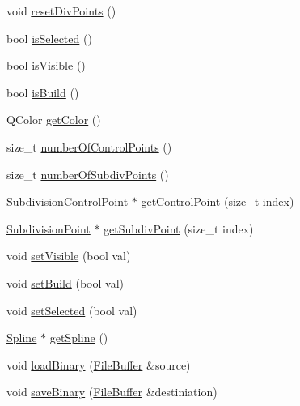 \begin{DoxyCompactItemize}
void \hyperlink{classShipCAD_1_1SubdivisionControlCurve_a34e280e9ba6e6705577d1afd229e9f20}{reset\-Div\-Points} ()
\item 
bool \hyperlink{classShipCAD_1_1SubdivisionControlCurve_a8b3c57aba1c16b77b902daacd7b88d0c}{is\-Selected} ()
\item 
bool \hyperlink{classShipCAD_1_1SubdivisionControlCurve_a36bcf74cf20d7f1ae888f25f774b040d}{is\-Visible} ()
\item 
bool \hyperlink{classShipCAD_1_1SubdivisionControlCurve_a6d0039b0dac74ed558bfb684fb4b4497}{is\-Build} ()
\item 
Q\-Color \hyperlink{classShipCAD_1_1SubdivisionControlCurve_a1dd7d33fd574c3cfdd53ccbb13abb695}{get\-Color} ()
\item 
size\-\_\-t \hyperlink{classShipCAD_1_1SubdivisionControlCurve_aaa9d504f115655dbb930493d96b9db62}{number\-Of\-Control\-Points} ()
\item 
size\-\_\-t \hyperlink{classShipCAD_1_1SubdivisionControlCurve_a7b68fcef6035edcb10fedc996d10272f}{number\-Of\-Subdiv\-Points} ()
\item 
\hyperlink{classShipCAD_1_1SubdivisionControlPoint}{Subdivision\-Control\-Point} $\ast$ \hyperlink{classShipCAD_1_1SubdivisionControlCurve_a0331fade870dd4856c070e2f487882b5}{get\-Control\-Point} (size\-\_\-t index)
\item 
\hyperlink{classShipCAD_1_1SubdivisionPoint}{Subdivision\-Point} $\ast$ \hyperlink{classShipCAD_1_1SubdivisionControlCurve_a52b12b58d524baba317ab6504e80018f}{get\-Subdiv\-Point} (size\-\_\-t index)
\item 
void \hyperlink{classShipCAD_1_1SubdivisionControlCurve_ac536de424624a4ae312029fe643f4b61}{set\-Visible} (bool val)
\item 
void \hyperlink{classShipCAD_1_1SubdivisionControlCurve_afb98b225e0dc255272a69e96c14eedb7}{set\-Build} (bool val)
\item 
void \hyperlink{classShipCAD_1_1SubdivisionControlCurve_abaf7f7cfec21eedacf55b1654f3e7f2f}{set\-Selected} (bool val)
\item 
\hyperlink{classShipCAD_1_1Spline}{Spline} $\ast$ \hyperlink{classShipCAD_1_1SubdivisionControlCurve_a83a97a77d42df146d45d3751d8973f02}{get\-Spline} ()
\item 
void \hyperlink{classShipCAD_1_1SubdivisionControlCurve_ad2a7118ea074ce1b7f61586f08039d2a}{load\-Binary} (\hyperlink{classShipCAD_1_1FileBuffer}{File\-Buffer} \&source)
\item 
void \hyperlink{classShipCAD_1_1SubdivisionControlCurve_a3ef4c7ce3e2d9a2fe4f90ebf35ffc033}{save\-Binary} (\hyperlink{classShipCAD_1_1FileBuffer}{File\-Buffer} \&destiniation)

\end{DoxyCompactItemize}
